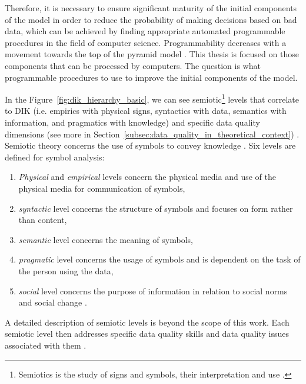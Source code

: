 			Therefore, it is necessary to ensure significant maturity of the initial components of the model in order to reduce the probability of making decisions based on bad data, which can be achieved by finding appropriate automated programmable procedures in the field of computer science. Programmability decreases with a movement towards the top of the pyramid model \cite{Huang2018}. This thesis is focused on those components that can be processed by computers. The question is what programmable procedures to use to improve the initial components of the model.
			
			In the Figure~\ref{fig:dik_hierarchy_basic}, we can see semiotic\footnote{Semiotics is the study of signs and symbols, their interpretation and use \cite{Huang2018}.} levels that correlate to DIK (i.e. empirics with physical signs, syntactics with data, semantics with information, and pragmatics with knowledge) and specific data quality dimensions (see more in Section~\ref{subsec:data_quality_in_theoretical_context}) \cite{Huang2018}. Semiotic theory concerns the use of symbols to convey knowledge \cite{Shanks1998}. Six levels are defined for symbol analysis:
						
			\begin{enumerate}
				\item \emph{Physical} and \emph{empirical} levels concern the physical media and use of the physical media for communication of symbols, 
				\item \emph{syntactic} level concerns the structure of symbols and focuses on form rather than content,
				\item \emph{semantic} level concerns the meaning of symbols,
				\item \emph{pragmatic} level concerns the usage of symbols and is dependent on the task of the person using the data,
				\item \emph{social} level concerns the purpose of information in relation to social norms and social change \cite{Shanks1998} \cite{Huang2018}.
			\end{enumerate}					 
			 
			 A detailed description of semiotic levels is beyond the scope of this work. Each semiotic level then addresses specific data quality skills and data quality issues associated with them \cite{Huang2018} . 
		
